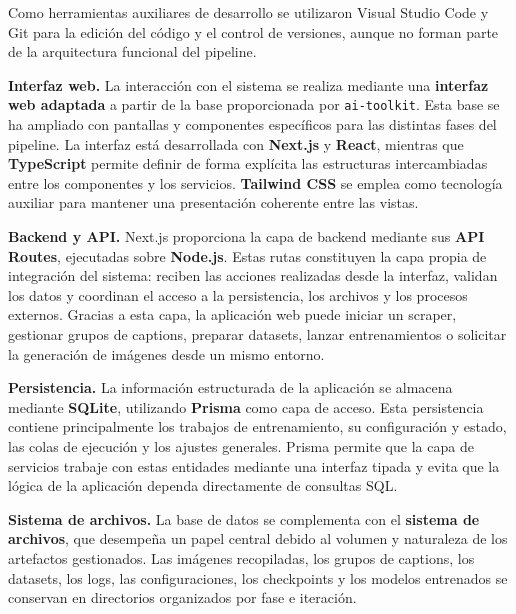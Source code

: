 \documentclass[a4paper,11pt,titlepage]{scrbook}
\begin{document}
\medskip

Como herramientas auxiliares de desarrollo se utilizaron Visual Studio Code y Git para la edición del código y el control de versiones, aunque no forman parte de la arquitectura funcional del pipeline.

\medskip

\textbf{Interfaz web.}
La interacción con el sistema se realiza mediante una \textbf{interfaz web adaptada} a partir de la base proporcionada por \texttt{ai-toolkit}. Esta base se ha ampliado con pantallas y componentes específicos para las distintas fases del pipeline. La interfaz está desarrollada con \textbf{Next.js} y \textbf{React}, mientras que \textbf{TypeScript} permite definir de forma explícita las estructuras intercambiadas entre los componentes y los servicios. \textbf{Tailwind CSS} se emplea como tecnología auxiliar para mantener una presentación coherente entre las vistas.

\medskip

\textbf{Backend y API.}
Next.js proporciona la capa de backend mediante sus \textbf{API Routes}, ejecutadas sobre \textbf{Node.js}. Estas rutas constituyen la capa propia de integración del sistema: reciben las acciones realizadas desde la interfaz, validan los datos y coordinan el acceso a la persistencia, los archivos y los procesos externos. Gracias a esta capa, la aplicación web puede iniciar un scraper, gestionar grupos de captions, preparar datasets, lanzar entrenamientos o solicitar la generación de imágenes desde un mismo entorno.

\medskip

\textbf{Persistencia.}
La información estructurada de la aplicación se almacena mediante \textbf{SQLite}, utilizando \textbf{Prisma} como capa de acceso. Esta persistencia contiene principalmente los trabajos de entrenamiento, su configuración y estado, las colas de ejecución y los ajustes generales. Prisma permite que la capa de servicios trabaje con estas entidades mediante una interfaz tipada y evita que la lógica de la aplicación dependa directamente de consultas SQL.

\medskip

\textbf{Sistema de archivos.}
La base de datos se complementa con el \textbf{sistema de archivos}, que desempeña un papel central debido al volumen y naturaleza de los artefactos gestionados. Las imágenes recopiladas, los grupos de captions, los datasets, los logs, las configuraciones, los checkpoints y los modelos entrenados se conservan en directorios organizados por fase e iteración.
\end{document}
